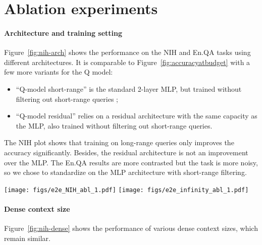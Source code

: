 %

%

%
%
%
%
%
%
%
%
%
%


\section{Ablation experiments}

\paragraph{Architecture and training setting}
\label{app:archablation}

Figure~\ref{fig:nih-arch} shows the performance on the NIH and En.QA tasks using different architectures.
It is comparable to Figure~\ref{fig:accuracyatbudget} with a few more variants for the Q model: 
\begin{itemize}
    \item 
    ``Q-model short-range'' is the standard 2-layer MLP, but trained without filtering out short-range queries ;
    \item 
    ``Q-model residual'' relies on a residual architecture with the same capacity as the MLP, also trained without filtering out short-range queries.
\end{itemize}

The NIH plot shows that training on long-range queries only improves the accuracy significantly. 
Besides, the residual architecture is not an improvement over the MLP. 
The En.QA results are more contrasted but the task is more noisy, so we chose to standardize on the MLP architecture with short-range filtering. 

\begin{figure*}
    \centering
    \texttt{[image: figs/e2e\_NIH\_abl\_1.pdf]}%
    \texttt{[image: figs/e2e\_infinity\_abl\_1.pdf]}  
    \caption{
        Comparison of architectural variants on the needle-in-haystack (left) and InfiniteBench En.QA (right) tasks. 
    }
    \label{fig:nih-arch}
\end{figure*}

\paragraph{Dense context size}
\label{app:densecontext}

Figure~\ref{fig:nih-dense} shows the performance of various dense context sizes, which remain similar.

